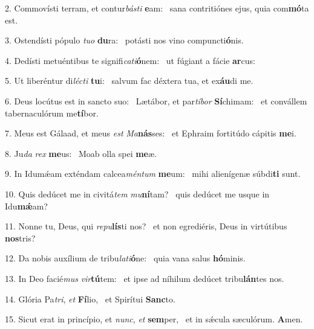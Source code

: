 2. Commovísti terram, et contur\textit{bás}\textit{ti} \textbf{e}am: \ast\  sana contritiónes ejus, quia com\textbf{mó}ta est.\

3. Ostendísti pópulo \textit{tu}\textit{o} \textbf{du}ra: \ast\  potásti nos vino compuncti\textbf{ó}nis.\

4. Dedísti metuéntibus te signifi\textit{ca}\textit{ti}\textbf{ó}nem: \ast\  ut fúgiant a fácie \textbf{ar}cus:\

5. Ut liberéntur di\textit{léc}\textit{ti} \textbf{tu}i: \ast\  salvum fac déxtera tua, et ex\textbf{áu}di me.\

6. Deus locútus est in sancto suo: \dag\  Lætábor, et par\textit{tí}\textit{bor} \textbf{Sí}chimam: \ast\  et convállem tabernaculórum me\textbf{tí}bor.\

7. Meus est Gálaad, et meus \textit{est} \textit{Ma}\textbf{nás}ses: \ast\  et Ephraim fortitúdo cápitis \textbf{me}i.\

8. Ju\textit{da} \textit{rex} \textbf{me}us: \ast\  Moab olla spei \textbf{me}æ.\

9. In Idumǽam exténdam calcea\textit{mén}\textit{tum} \textbf{me}um: \ast\  mihi alienígenæ súbdi\textbf{ti} sunt.\

10. Quis dedúcet me in civitá\textit{tem} \textit{mu}\textbf{ní}tam? \ast\  quis dedúcet me usque in Idu\textbf{mǽ}am?\

11. Nonne tu, Deus, qui \textit{re}\textit{pu}\textbf{lís}ti nos? \ast\  et non egrediéris, Deus in virtútibus \textbf{nos}tris?\

12. Da nobis auxílium de tribu\textit{la}\textit{ti}\textbf{ó}ne: \ast\  quia vana salus \textbf{hó}minis.\

13. In Deo facié\textit{mus} \textit{vir}\textbf{tú}tem: \ast\  et ipse ad níhilum dedúcet tribu\textbf{lán}tes nos.\

14. Glória Pa\textit{tri}, \textit{et} \textbf{Fí}lio, \ast\  et Spirítui \textbf{Sanc}to.\

15. Sicut erat in princípio, et \textit{nunc}, \textit{et} \textbf{sem}per, \ast\  et in sǽcula sæculórum. \textbf{A}men.\

